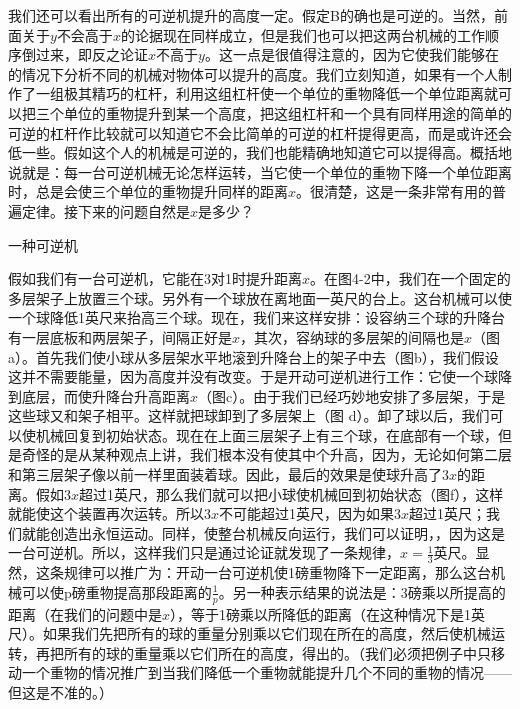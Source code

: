 \documentclass[11pt,oneside]{book}
\begin{document}
\begin{common-format}
我们还可以看出所有的可逆机提升的高度一定。假定B的确也是可逆的。当然，前面关于$ y $不会高于$ x $的论据现在同样成立，但是我们也可以把这两台机械的工作顺序倒过来，即反之论证$ x $不高于$ y $。这一点是很值得注意的，因为它使我们能够在的情况下分析不同的机械对物体可以提升的高度。我们立刻知道，如果有一个人制作了一组极其精巧的杠杆，利用这组杠杆使一个单位的重物降低一个单位距离就可以把三个单位的重物提升到某一个高度，把这组杠杆和一个具有同样用途的简单的可逆的杠杆作比较就可以知道它不会比简单的可逆的杠杆提得更高，而是或许还会低一些。假如这个人的机械是可逆的，我们也能精确地知道它可以提得高。概括地说就是：每一台可逆机械无论怎样运转，当它使一个单位的重物下降一个单位距离时，总是会使三个单位的重物提升同样的距离$ x $。很清楚，这是一条非常有用的普遍定律。接下来的问题自然是$ x $是多少？
\begin{fig}{一种可逆机}
\label{fig:一种可逆机}
\end{fig}
假如我们有一台可逆机，它能在3对1时提升距离$ x $。在图4-2中，我们在一个固定的多层架子上放置三个球。另外有一个球放在离地面一英尺的台上。这台机械可以使一个球降低1英尺来抬高三个球。现在，我们来这样安排：设容纳三个球的升降台有一层底板和两层架子，间隔正好是$ x $，其次，容纳球的多层架的间隔也是$ x $（图a）。首先我们使小球从多层架水平地滚到升降台上的架子中去（图b），我们假设这并不需要能量，因为高度并没有改变。于是开动可逆机进行工作：它使一个球降到底层，而使升降台升高距离$ x $（图c）。由于我们已经巧妙地安排了多层架，于是这些球又和架子相平。这样就把球卸到了多层架上（图 d）。卸了球以后，我们可以使机械回复到初始状态。现在在上面三层架子上有三个球，在底部有一个球，但是奇怪的是从某种观点上讲，我们根本没有使其中个升高，因为，无论如何第二层和第三层架子像以前一样里面装着球。因此，最后的效果是使球升高了$ 3x$的距离。假如$  3x $超过1英尺，那么我们就可以把小球使机械回到初始状态（图f），这样就能使这个装置再次运转。所以$ 3x $不可能超过1英尺，因为如果$ 3x $超过1英尺；我们就能创造出永恒运动。同样，使整台机械反向运行，我们可以证明，，因为这是一台可逆机。所以，这样我们只是通过论证就发现了一条规律，$ x=\frac{1}{3} $英尺。显然，这条规律可以推广为：开动一台可逆机使1磅重物降下一定距离，那么这台机械可以使p磅重物提高那段距离的$ \frac{1}{p} $。另一种表示结果的说法是：3磅乘以所提高的距离（在我们的问题中是$ x $），等于1磅乘以所降低的距离（在这种情况下是1英尺）。如果我们先把所有的球的重量分别乘以它们现在所在的高度，然后使机械运转，再把所有的球的重量乘以它们所在的高度，得出的。（我们必须把例子中只移动一个重物的情况推广到当我们降低一个重物就能提升几个不同的重物的情况——但这是不准的。）


\end{common-format}
\end{document}
